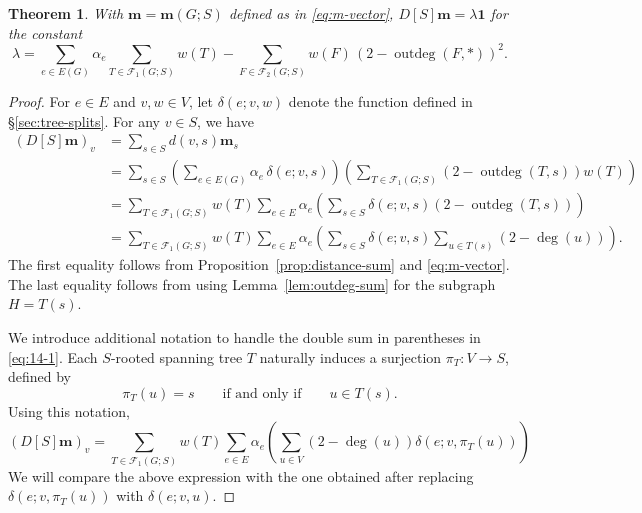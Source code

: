 \documentclass[12pt]{amsart}
\newtheorem{thm}{Theorem}[section]
\newtheorem{cor}[thm]{Corollary}
\theoremstyle{definition}
\newcommand{\bone}{\mathbf{1}}
\newcommand{\boldm}{\mathbf{m}}
\newcommand{\tr}{\intercal}
\newcommand{\trees}{\mathcal{F}_1}
\newcommand{\forests}{\mathcal{F}}
\DeclareMathOperator{\outdeg}{outdeg}
\begin{document}

\begin{thm}
\label{thm:m-distance-product}
With $\boldm = \boldm(G;S)$ defined as in \eqref{eq:m-vector},
$D[S] \boldm = \lambda \mathbf{1}$
for the constant
\begin{equation}
\label{eq:lambda}
	\lambda = \sum_{e \in E(G)} \alpha_e \sum_{T\in \trees(G;S)} w({T}) - \sum_{F \in \forests_2(G;S)} w({F}) \, (2 - \outdeg(F,*))^2.
\end{equation}
\end{thm}

\begin{proof}
For $e\in E$ and $v,w\in V$, let $\delta(e;v,w)$ denote the function defined in \S\ref{sec:tree-splits}.
For any $v \in S$, we have
\begin{align}
  (D[S] \boldm)_v &= \sum_{s \in S} d(v,s) \boldm_s \\
  &= \sum_{s \in S} \left( \sum_{e \in E(G)} \alpha_e\, \delta(e; v,s) \right) \left( \sum_{T \in \trees(G;S)} (2 - \outdeg(T,s)) w({T}) \right) \\
  &= \sum_{T\in \trees(G;S)} w({T}) \sum_{e\in E} \alpha_e \left( \sum_{s \in S} \delta(e; v,s) (2 - \outdeg(T, s)) \right) \\
  &= \sum_{T \in \trees(G;S)} w({T}) \sum_{e \in E} \alpha_e \left( \sum_{s \in S} \delta(e; v,s) \sum_{u \in T(s)} (2 - \deg(u)) \right). \label{eq:14-1}
\end{align}
The first equality follows from Proposition~\ref{prop:distance-sum} and \eqref{eq:m-vector}. The last equality follows from using Lemma~\ref{lem:outdeg-sum} for the subgraph $H = T(s)$.

We introduce additional notation to handle the double sum in parentheses in \eqref{eq:14-1}.
Each $S$-rooted spanning tree $T$ naturally induces a surjection $\pi_T\colon V \to S$, defined by 
\[
	\pi_T(u) = s \qquad\text{if and only if}\qquad u \in T(s).
\]
Using this notation,
\begin{equation}
\label{eq:9}
	(D[S] \boldm)_v = \sum_{T \in \trees(G;S)} w({T}) \sum_{e \in E} \alpha_e \left( \sum_{u \in V} (2 - \deg(u)) \delta(e; v,\pi_T(u)) \right)
\end{equation}
We will compare the above expression with the one obtained after replacing $\delta(e; v,\pi_T(u))$ with $\delta(e; v, u)$.


\end{proof}
\end{document}
